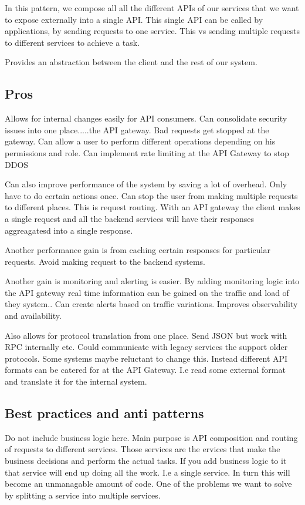 \documentclass[a4paper, 11pt]{book}
\begin{document}
    In this pattern, we compose all all the different APIs of our services that we want to expose externally into a single API.
    This single API can be called by applications, by sending requests to one service. This vs sending multiple requests to different services to achieve a task.

    Provides an abstraction between the client and the rest of our system.

    \subsection{Pros}
    Allows for internal changes easily for API consumers.
    Can consolidate security issues into one place.....the API gateway.
    Bad requests get stopped at the gateway.
    Can allow a user to perform different operations depending on his permissions and role.
    Can implement rate limiting at the API Gateway to stop DDOS

    Can also improve performance of the system by saving a lot of overhead.
    Only have to do certain actions once.
    Can stop the user from making multiple requests to different places.
    This is request routing.
    With an API gateway the client makes a single request and all the backend services will have their responses aggreagatesd into a single response.

    Another performance gain is from caching certain responses for particular requests.
    Avoid making request to the backend systems.

    Another gain is monitoring and alerting is easier.
    By adding monitoring logic into the API gateway real time information can be gained on the traffic and load of they system..
    Can create alerts based on traffic variations.
    Improves observability and availability.

    Also allows for protocol translation from one place.
    Send JSON but work with RPC internally etc.
    Could communicate with legacy services the support older protocols.
    Some systems maybe reluctant to change this.
    Instead different API formats can be catered for at the API Gateway.
    I.e read some external format and translate it for the internal system.

    \subsection{Best practices and anti patterns}
    Do not include business logic here. Main purpose is API composition and routing of requests to different services.
    Those services are the ervices that make the business decisions and perform the actual tasks.
    If you add business logic to it that service will end up doing all the work. I.e a single service.
    In turn this will become an unmanagable amount of code.
    One of the problems we want to solve by splitting a service into multiple services.
\end{document}
